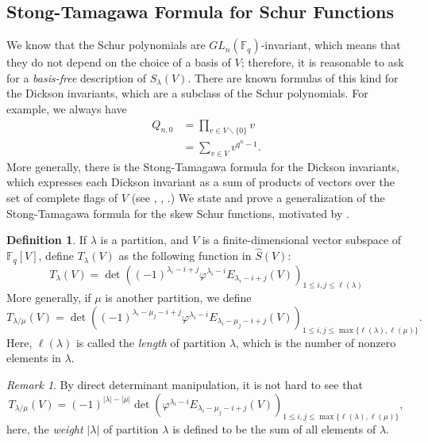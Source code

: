\documentclass[12pt,a4paper]{report}
\theoremstyle{definition}
\newtheorem{definition}[theorem]{Definition}
\theoremstyle{remark}
\newtheorem*{remark}{Remark}
\theoremstyle{definition}
\begin{document}
\subsection{Stong-Tamagawa Formula for Schur Functions}\label{subsection:stong_tamagawa_gen}
We know that the Schur polynomials are $GL_n(\mathbb{F}_q)$-invariant, which means that they do not depend on the choice of a basis of $V$; therefore, it is reasonable to ask for a \emph{basis-free} description of $S_{\lambda}(V)$. There are known formulas of this kind for the Dickson invariants, which are a subclass of the Schur polynomials. For example, we always have
\begin{align*}
    Q_{n, 0} &= \prod\limits_{v\in V\backslash\{0\}}v\\
    &=\sum\limits_{v\in V}v^{q^n-1}.
\end{align*}
More generally, there is the Stong-Tamagawa formula for the Dickson invariants, which expresses each Dickson invariant as a sum of products of vectors over the set of complete flags of $V$ (see \cite[Proposition 8.1.3]{benson_1993}, \cite[Chapter 1, Section 2, Example 26]{macdonald_symmetric_1979}, \cite[(7.24)]{macdonald_schur_1992}.) We state and prove a generalization of the Stong-Tamagawa formula for the skew Schur functions, motivated by \cite[Conjecture (7.25)]{macdonald_schur_1992}.
\begin{definition}\label{def:T} If $\lambda$ is a partition, and $V$ is a finite-dimensional vector subspace of $\mathbb{F}_q[V]$, define $T_{\lambda} (V)$ as the following function in $\widehat{S}(V)$: 
\begin{equation*}
T_{\lambda} (V) = \det((-1)^{\lambda_i - i+ j}\varphi^{\lambda_i - i} E_{\lambda_i - i+ j}(V))_{1 \leq i, j \leq \ell (\lambda)} 
\end{equation*}
More generally, if $\mu$ is another partition, we define   
\begin{equation*}
    T_{\lambda/\mu}(V) = \det((-1)^{\lambda_i - \mu_j - i+ j}\varphi^{\lambda_i - i} E_{\lambda_i - \mu_j - i+ j}(V))_{1\leq i, j\leq \max\{\ell(\lambda), \ell(\mu)\}}.   
\end{equation*}
Here, $\ell(\lambda)$ is called the \emph{length} of partition $\lambda$, which is the number of nonzero elements in $\lambda$.
\end{definition}
\begin{remark}
    By direct determinant manipulation, it is not hard to see that
    \begin{equation*}
        T_{\lambda/\mu}(V)=(-1)^{|\lambda|-|\mu|}\det(\varphi^{\lambda_i - i} E_{\lambda_i - \mu_j - i+ j}(V))_{1\leq i, j\leq \max\{\ell(\lambda), \ell(\mu)\}},
    \end{equation*}
    here, the \emph{weight} $|\lambda|$ of partition $\lambda$ is defined to be the sum of all elements of $\lambda$.
\end{remark}
\end{document}
